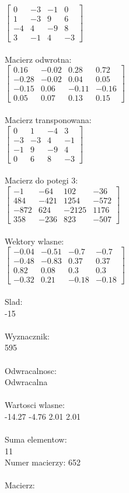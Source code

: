 \documentclass[a4paper,12pt]{article}
\begin{document}
$\begin{bmatrix} 0&-3&-1&0\\1&-3&9&6\\-4&4&-9&8\\3&-1&4&-3 \end{bmatrix}$
\\
\\
Macierz odwrotna:\\

$\begin{bmatrix} 0.16&-0.02&0.28&0.72\\-0.28&-0.02&0.04&0.05\\-0.15&0.06&-0.11&-0.16\\0.05&0.07&0.13&0.15 \end{bmatrix}$
\\
\\
Macierz transponowana:\\

$\begin{bmatrix} 0&1&-4&3\\-3&-3&4&-1\\-1&9&-9&4\\0&6&8&-3 \end{bmatrix}$
\\
\\
Macierz do potegi 3:\\

$\begin{bmatrix} -1&-64&102&-36\\484&-421&1254&-572\\-872&624&-2125&1176\\358&-236&823&-507 \end{bmatrix}$
\\
\\
Wektory wlasne:\\

$\begin{bmatrix} -0.04&-0.51&-0.7&-0.7\\-0.48&-0.83&0.37&0.37\\0.82&0.08&0.3&0.3\\-0.32&0.21&-0.18&-0.18 \end{bmatrix}$
\\
\\
Slad:\\
-15
\\
\\
Wyznacznik:\\
595
\\
\\
Odwracalnosc:\\
Odwracalna
\\
\\
Wartosci wlasne:\\
-14.27 -4.76 2.01 2.01
\\
\\
Suma elementow:\\
11
\\
\newpage
Numer macierzy:
652
\\
\\
Macierz:\\
\end{document}
